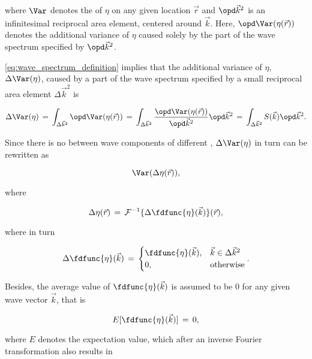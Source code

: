 {where $\Var$ denotes the \variance of $\eta$ on any given location $\vec{r}$ and $\opd\vec{k}^2$ is an infinitesimal reciprocal area element, centered around $\vec{k}$. Here, $\opd \Var(\eta(\vec{r}))$ denotes the additional variance of $\eta$ caused solely by the part of the wave spectrum specified by $\opd\vec{k}^2$.

\eqref{eq:wave_spectrum_definition} implies that the additional variance of $\eta$, $\Delta\Var(\eta)$, caused by a part of the wave spectrum specified by a small reciprocal area element $\Delta\vec{k}^2$ is

\begin{equation}
\Delta\Var(\eta) \,=\, \int_{\Delta\vec{k}^2}\opd \Var(\eta(\vec{r})) \,=\, \int_{\Delta\vec{k}^2}\frac{\opd \Var(\eta(\vec{r}))}{\opd\vec{k}^2}\opd\vec{k}^2 \,=\, \int_{\Delta\vec{k}^2}S(\vec{k})\opd\vec{k}^2.
\end{equation}

Since there is no \correlation between wave components of different \wavelengths, $\Delta\Var(\eta)$ in turn can be rewritten as

\begin{equation}
\Var(\Delta\eta(\vec{r})),
\end{equation}

where

\begin{equation}
\Delta\eta(\vec{r}) \,=\, \mathcal{F}^{-1}\{\Delta\fdfunc{\eta}(\vec{k})\}(\vec{r}),
\end{equation}

where in turn

\begin{equation}
\Delta\fdfunc{\eta}(\vec{k}) \,=\, \begin{cases}
\fdfunc{\eta}(\vec{k}), & \vec{k} \in \Delta\vec{k}^2 \\
0, & \text{otherwise}
\end{cases}.
\end{equation}

Besides, the average value of $\fdfunc{\eta}(\vec{k})$ is assumed to be 0 for any given wave vector $\vec{k}$, that is

\begin{equation} \label{eq:zero_expectation_value_reciprocal_space}
E[\fdfunc{\eta}(\vec{k})] \,=\, 0,
\end{equation}

where $E$ denotes the expectation value, which after an inverse Fourier transformation also results in 

}
